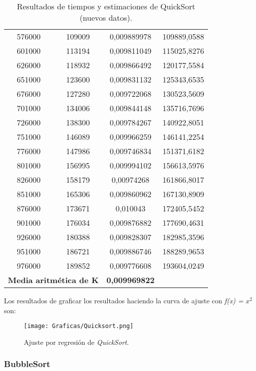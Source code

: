 \documentclass[a4paper,12pt]{article} %
\begin{document}
\begin{table}[H]
{\begin{tabular}{|c|c|c|c|}
			576000 & 109009& 0,009889978  & 109889,0588  \\
			601000 & 113194& 0,009811049  & 115025,8276  \\
			626000 & 118932& 0,009866492  & 120177,5584  \\
			651000 & 123600& 0,009831132  & 125343,6535  \\
			676000 & 127280& 0,009722068  & 130523,5609  \\
			701000 & 134006& 0,009844148  & 135716,7696  \\
			726000 & 138300& 0,009784267  & 140922,8051  \\
			751000 & 146089& 0,009966259  & 146141,2254  \\
			776000 & 147986& 0,009746834  & 151371,6182  \\
			801000 & 156995& 0,009994102  & 156613,5976  \\
			826000 & 158179& 0,00974268   & 161866,8017  \\
			851000 & 165306& 0,009860962  & 167130,8909  \\
			876000 & 173671& 0,010043     & 172405,5452  \\
			901000 & 176034& 0,009876882  & 177690,4631  \\
			926000 & 180388& 0,009828307  & 182985,3596  \\
			951000 & 186721& 0,009886746  & 188289,9653  \\
			976000 & 189852& 0,009776608  & 193604,0249  \\
			\hline
			\multicolumn{2}{l}{\textbf{Media aritmética de K}} & \textbf{0,009969822}                                                                                     \\
			\hline
		\end{tabular}%
	}
	\caption{Resultados de tiempos y estimaciones de QuickSort (nuevos datos).}
	\label{tab:resultados_nuevos}
\end{table}


Los resultados de graficar los resultados haciendo la curva de ajuste con \textit{f(x) = $x^{2}$} son:
\begin{figure}[H]
	\centering
	\texttt{[image: Graficas/Quicksort.png]}
	\caption{Ajuste por regresión de \textit{QuickSort}.}
\end{figure}

\subsubsection{BubbleSort}
\end{document}
